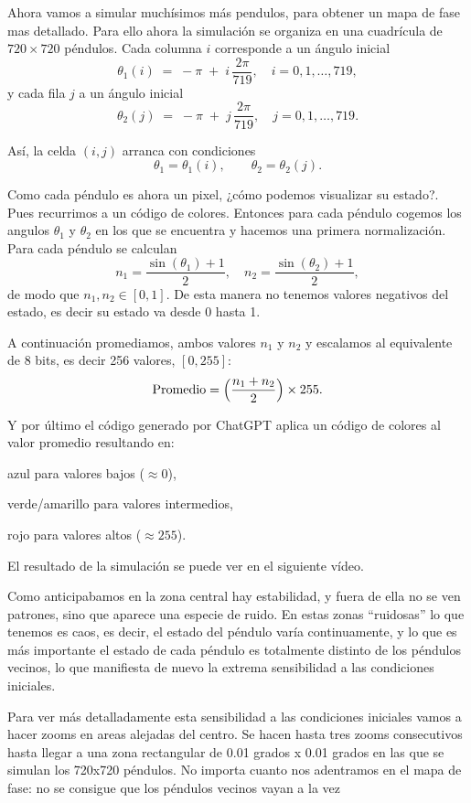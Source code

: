 \documentclass[
  10pt,
  a4paper,
  DIV=11,
  numbers=noendperiod,
  open=any]{scrreprt}
\numberwithin{equation}{chapter}
\numberwithin{equation}{chapter}
\renewcommand{\[}{\begin{equation}}
\renewcommand{\]}{\end{equation}}
\begin{document}
Ahora vamos a simular muchísimos más pendulos, para obtener un mapa de
fase mas detallado. Para ello ahora la simulación se organiza en una
cuadrícula de \(720 \times 720\) péndulos. Cada columna \(i\)
corresponde a un ángulo inicial \[
\theta_1(i) \;=\; -\pi \;+\; i\,\frac{2\pi}{719}, 
\quad i = 0,1,\dots,719,
\] y cada fila \(j\) a un ángulo inicial \[
\theta_2(j) \;=\; -\pi \;+\; j\,\frac{2\pi}{719}, 
\quad j = 0,1,\dots,719.
\]

Así, la celda \((i,j)\) arranca con condiciones \[
\theta_1 = \theta_1(i), 
\qquad
\theta_2 = \theta_2(j).
\]

Como cada péndulo es ahora un pixel, ¿cómo podemos visualizar su
estado?. Pues recurrimos a un código de colores. Entonces para cada
péndulo cogemos los angulos \(\theta_1\) y \(\theta_2\) en los que se
encuentra y hacemos una primera normalización. Para cada péndulo se
calculan \[
     n_1 = \frac{\sin(\theta_1) + 1}{2},
     \quad
     n_2 = \frac{\sin(\theta_2) + 1}{2},
   \] de modo que \(n_1,n_2 \in [0,1]\). De esta manera no tenemos
valores negativos del estado, es decir su estado va desde 0 hasta 1.

A continuación promediamos, ambos valores \(n_1\) y \(n_2\) y escalamos
al equivalente de 8 bits, es decir 256 valores, \([0,255]\): \[
     \text{Promedio} = \Bigl(\frac{n_1 + n_2}{2}\Bigr)\times 255.
   \]

Y por último el código generado por ChatGPT aplica un código de colores
al valor promedio resultando en:

azul para valores bajos (\(\approx 0\)),

verde/amarillo para valores intermedios,

rojo para valores altos (\(\approx 255\)).

El resultado de la simulación se puede ver en el siguiente vídeo.

Como anticipabamos en la zona central hay estabilidad, y fuera de ella
no se ven patrones, sino que aparece una especie de ruido. En estas
zonas ``ruidosas'' lo que tenemos es caos, es decir, el estado del
péndulo varía continuamente, y lo que es más importante el estado de
cada péndulo es totalmente distinto de los péndulos vecinos, lo que
manifiesta de nuevo la extrema sensibilidad a las condiciones iniciales.

Para ver más detalladamente esta sensibilidad a las condiciones
iniciales vamos a hacer zooms en areas alejadas del centro. Se hacen
hasta tres zooms consecutivos hasta llegar a una zona rectangular de
0.01 grados x 0.01 grados en las que se simulan los 720x720 péndulos. No
importa cuanto nos adentramos en el mapa de fase: no se consigue que los
péndulos vecinos vayan a la vez
\end{document}
